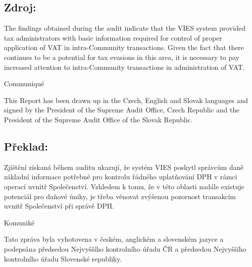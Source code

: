 \documentclass[10pt]{article}
\begin{document}
\subsection*{Zdroj:}

The findings obtained during the audit indicate that the VIES system provided tax administrators with basic information required for control of proper application of VAT in intra-Community transactions.
Given the fact that there continues to be a potential for tax evasions in this area, it is necessary to pay increased attention to intra-Community transactions in administration of VAT.


Communiqué

This Report has been drawn up in the Czech, English and Slovak languages and signed by the President of the Supreme Audit Office, Czech Republic and the President of the Supreme Audit Office of the Slovak Republic.


\pagebreak

\subsection*{Překlad:}

Zjištění získaná během auditu ukazují, že systém VIES poskytl správcům daně základní informace potřebné pro kontrolu řádného uplatňování DPH v rámci operací uvnitř Společenství.
Vzhledem k tomu, že v této oblasti nadále existuje potenciál pro daňové úniky, je třeba věnovat zvýšenou pozornost transakcím uvnitř Společenství při správě DPH.


Komuniké

Tato zpráva byla vyhotovena v českém, anglickém a slovenském jazyce a podepsána předsedou Nejvyššího kontrolního úřadu ČR a předsedou Nejvyššího kontrolního úřadu Slovenské republiky.
\end{document}
